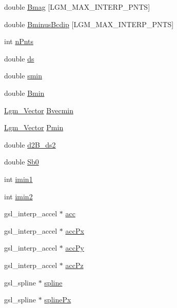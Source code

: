\begin{CompactItemize}
\item 
double \hyperlink{struct_lgm___mag_model_info_7d9e308c1b0c6e09a52f4c3c2d93b6cb}{Bmag} \mbox{[}LGM\_\-MAX\_\-INTERP\_\-PNTS\mbox{]}
\item 
double \hyperlink{struct_lgm___mag_model_info_d3f3c09afc338a28ddb1213be42a4ca7}{BminusBcdip} \mbox{[}LGM\_\-MAX\_\-INTERP\_\-PNTS\mbox{]}
\item 
int \hyperlink{struct_lgm___mag_model_info_e64e724dd0713b2ba2fca5aedab3fd34}{nPnts}
\item 
double \hyperlink{struct_lgm___mag_model_info_ac2192aa882430a630cad1a1b5131a29}{ds}
\item 
double \hyperlink{struct_lgm___mag_model_info_588dcb85c838ec933ddca7fd85319356}{smin}
\item 
double \hyperlink{struct_lgm___mag_model_info_2ac3a99381d281d4caabf024a33f0b31}{Bmin}
\item 
\hyperlink{struct_lgm___vector}{Lgm\_\-Vector} \hyperlink{struct_lgm___mag_model_info_2331552c154915274f41a4113148557b}{Bvecmin}
\item 
\hyperlink{struct_lgm___vector}{Lgm\_\-Vector} \hyperlink{struct_lgm___mag_model_info_5bafc8f6aad6cc63366225b1a7c42901}{Pmin}
\item 
double \hyperlink{struct_lgm___mag_model_info_4cfe25e04c92794254faa1a0abb4d817}{d2B\_\-ds2}
\item 
double \hyperlink{struct_lgm___mag_model_info_42a3a606a80dbe9a94436854fdef0516}{Sb0}
\item 
int \hyperlink{struct_lgm___mag_model_info_7398fdf92dfab0dfd2d5ac11eaa570bc}{imin1}
\item 
int \hyperlink{struct_lgm___mag_model_info_b38a4f405262c1ee308e925285be06c2}{imin2}
\item 
gsl\_\-interp\_\-accel $\ast$ \hyperlink{struct_lgm___mag_model_info_7c9a9e6523a7a6e67a5b349e772e3765}{acc}
\item 
gsl\_\-interp\_\-accel $\ast$ \hyperlink{struct_lgm___mag_model_info_b695ec5d60e2b6c19e995ada21303a66}{accPx}
\item 
gsl\_\-interp\_\-accel $\ast$ \hyperlink{struct_lgm___mag_model_info_debd817de2dd24802efd42e4d61248bd}{accPy}
\item 
gsl\_\-interp\_\-accel $\ast$ \hyperlink{struct_lgm___mag_model_info_3f81b52b8e022a147d3ded46c8eae116}{accPz}
\item 
gsl\_\-spline $\ast$ \hyperlink{struct_lgm___mag_model_info_a4a622517a6af76ad0ff2c6f10465fdd}{spline}
\item 
gsl\_\-spline $\ast$ \hyperlink{struct_lgm___mag_model_info_7780e74c82195c308a42a01d815e05f9}{splinePx}

\end{CompactItemize}
